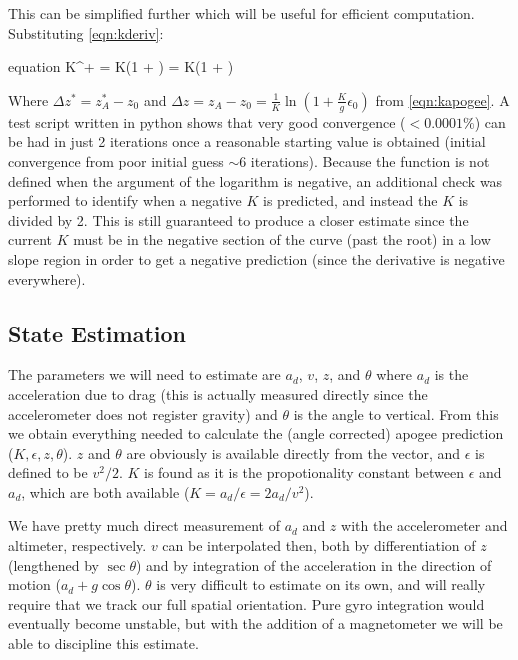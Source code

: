 \documentclass{article}
\begin{document}
	This can be simplified further which will be useful for efficient computation.  Substituting \eqref{eqn:kderiv}:
	
	\begin{empheq}[box=\fbox]{equation}
		K^+ = K\left(1 + \right) = K\left(1 + \right)
	\end{empheq}
	
	Where $\Delta z^* = z_A^* - z_0$ and $\Delta z = z_A - z_0 = \frac{1}{K}\ln\left(1 + \frac{K}{g}\epsilon_0\right)$ from \eqref{eqn:kapogee}.  A test script written in python shows that very good convergence ($<0.0001\si{\percent}$) can be had in just 2 iterations once a reasonable starting value is obtained (initial convergence from poor initial guess $\sim\!6$ iterations).  Because the function is not defined when the argument of the logarithm is negative, an additional check was performed to identify when a negative $K$ is predicted, and instead the $K$ is divided by 2.  This is still guaranteed to produce a closer estimate since the current $K$ must be in the negative section of the curve (past the root) in a low slope region in order to get a negative prediction (since the derivative is negative everywhere).
	
	\subsection{State Estimation}
	
	The parameters we will need to estimate are $a_d$, $v$, $z$, and $\theta$ where $a_d$ is the acceleration due to drag (this is actually measured directly since the accelerometer does not register gravity) and $\theta$ is the angle to vertical.  From this we obtain everything needed to calculate the (angle corrected) apogee prediction ($K,\epsilon,z,\theta$).  $z$ and $\theta$ are obviously is available directly from the vector, and $\epsilon$ is defined to be $v^2/2$.  $K$ is found as it is the propotionality constant between $\epsilon$ and $a_d$, which are both available ($K=a_d/\epsilon=2a_d/v^2$).
	
	We have pretty much direct measurement of $a_d$ and $z$ with the accelerometer and altimeter, respectively.  $v$ can be interpolated then, both by differentiation of $z$ (lengthened by $\sec\theta$) and by integration of the acceleration in the direction of motion ($a_d+g\cos\theta$).  $\theta$ is very difficult to estimate on its own, and will really require that we track our full spatial orientation.  Pure gyro integration would eventually become unstable, but with the addition of a magnetometer we will be able to discipline this estimate.
	
\end{document}
